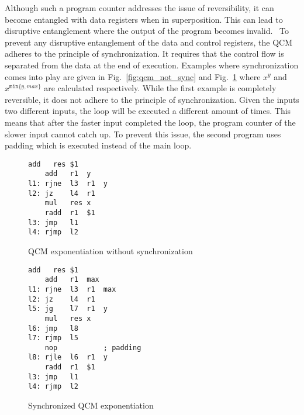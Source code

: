 Although such a program counter addresses the issue of reversibility, it can become entangled with data registers when in superposition. This can lead to disruptive entanglement where the output of the program becomes invalid.~\cite{YVC24} To prevent any disruptive entanglement of the data and control registers, the QCM adheres to the principle of synchronization. 
It requires that the control flow is separated from the data at the end of execution. 
Examples where synchronization comes into play are given in Fig.~\ref{fig:qcm_not_sync} and Fig.~\ref{fig:qcm_sync} where $x^y$ and $x^{\texttt{min}\{y, max\}}$ are calculated respectively. 
While the first example is completely reversible, it does not adhere to the principle of synchronization. Given the inputs two different inputs, the loop will be executed a different amount of times. This means that after the faster input completed the loop, the program counter of the slower input cannot catch up. To prevent this issue, the second program uses padding which is executed instead of the main loop. 
\begin{figure}
    \centering     
    \begin{minipage}{.40\textwidth}
        \vspace{7.5em}
        \begin{lstlisting}[linewidth=17em,style=QCM]
    add   res $1
    add   r1  y
l1: rjne  l3  r1  y
l2: jz    l4  r1
    mul   res x
    radd  r1  $1
l3: jmp   l1  
l4: rjmp  l2      
        \end{lstlisting}
        \caption{QCM exponentiation without synchronization}
        \label{fig:qcm_not_sync}
    \end{minipage}
    \hfill
    \begin{minipage}{.55\textwidth}
        \begin{lstlisting}[linewidth=23em,style=QCM]
    add   res $1
    add   r1  max
l1: rjne  l3  r1  max
l2: jz    l4  r1
l5: jg    l7  r1  y   
    mul   res x
l6: jmp   l8  
l7: rjmp  l5
    nop           ; padding
l8: rjle  l6  r1  y
    radd  r1  $1
l3: jmp   l1
l4: rjmp  l2
        \end{lstlisting}
        \caption{Synchronized QCM exponentiation}    
        \label{fig:qcm_sync}
    \end{minipage}
\end{figure}


